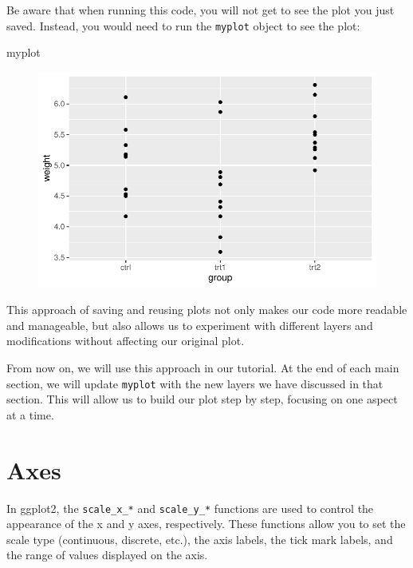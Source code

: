 \documentclass[
  letterpaper,
  DIV=11,
  numbers=noendperiod]{scrartcl}
\newenvironment{Shaded}{\begin{snugshade}}{\end{snugshade}}
\newcommand{\NormalTok}[1]{\textcolor[rgb]{0.00,0.23,0.31}{#1}}
\begin{document}
Be aware that when running this code, you will not get to see the plot
you just saved. Instead, you would need to run the \texttt{myplot}
object to see the plot:

\begin{Shaded}
\begin{Highlighting}[]
\NormalTok{myplot}
\end{Highlighting}
\end{Shaded}

\begin{figure}[H]

{\centering \includegraphics{ggplot2intro_files/figure-pdf/unnamed-chunk-6-1.pdf}

}

\end{figure}

This approach of saving and reusing plots not only makes our code more
readable and manageable, but also allows us to experiment with different
layers and modifications without affecting our original plot.

From now on, we will use this approach in our tutorial. At the end of
each main section, we will update \texttt{myplot} with the new layers we
have discussed in that section. This will allow us to build our plot
step by step, focusing on one aspect at a time.

\hypertarget{axes}{%
\section{Axes}\label{axes}}

In ggplot2, the \texttt{scale\_x\_*} and \texttt{scale\_y\_*} functions
are used to control the appearance of the x and y axes, respectively.
These functions allow you to set the scale type (continuous, discrete,
etc.), the axis labels, the tick mark labels, and the range of values
displayed on the axis.
\end{document}
